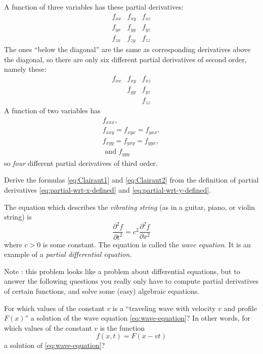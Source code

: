 \begin{multicols}{2}
A function of three variables has these partial derivatives:
\[
  \begin{matrix}
    f_{xx} & f_{xy} & f_{xz} \\
    f_{yx} & f_{yy} & f_{yz} \\
    f_{zx} & f_{zy} & f_{zz}
  \end{matrix}
\]
The ones ``below the diagonal'' are the same as corresponding derivatives
above the diagonal, so there are only six different partial derivatives
of second order, namely these:
\[
  \begin{matrix}
    f_{xx} & f_{xy} & f_{xz} \\
    & f_{yy} & f_{yz} \\
    & & f_{zz}
  \end{matrix}
\]
A function of two variables has 
\begin{gather*}
  f_{xxx}, \\
  f_{xxy}=f_{xyx}=f_{yxx}, \\
  f_{xyy}=f_{yxy}=f_{yyx},\\
  \text{ and } f_{yyy}
\end{gather*}
so \emph{four} different partial derivatives of third order.
\endanswer

\problem Derive the formulas \eqref{eq:Clairaut1} and  
\eqref{eq:Clairaut2} from the definition of partial derivatives
\eqref{eq:partial-wrt-x-defined} and
\eqref{eq:partial-wrt-y-defined}.

\problem The equation which describes the \textit{vibrating  string}  
(as in a guitar, piano, or violin string) is
\begin{equation}\label{eq:wave-equation}
  \frac{\partial^2 f}{\partial t^2} = c^2 \frac{\partial^2 f}{\partial x^2}
\end{equation}
where $c>0$ is some constant. The equation is called the \emph{wave
equation}.  It is an example of a \emph{partial differential equation.}

Note : this problem looks like a problem about differential
equations, but to answer the following questions you really only have
to compute partial derivatives of certain functions, and solve some
(easy) algebraic equations.

\subprob For which values of the constant $v$ is a ``traveling wave
with velocity $v$ and profile $F(x)$'' a solution of the wave equation
\eqref{eq:wave-equation}?  In other words, for which values of the constant $v$ is the function
\[
f(x, t) = F(x-vt)
\]
a solution of \eqref{eq:wave-equation}?


\end{multicols}
